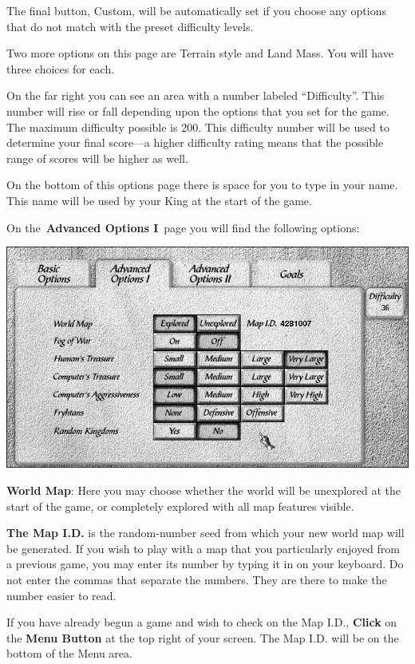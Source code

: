 The final button, Custom, will be automatically set if you choose any options that do not match with the preset difficulty levels.

Two more options on this page are Terrain style and Land Mass. You will have three choices for each.

On the far right you can see an area with a number labeled “Difficulty”. This number will rise or fall depending upon the options that you set for the game. The maximum difficulty possible is 200. This difficulty number will be used to determine your final score---a higher difficulty rating means that the possible range of scores will be higher as well.

On the bottom of this options page there is space for you to type in your name. This name will be used by your King at the start of the game.

On the \textbf{Advanced Options I} page you will find the following options:

\begin{center}
	\includegraphics[width=0.7\linewidth]{Iadvancedoptions1}
\end{center}

\textbf{World Map}: Here you may choose whether the world will be unexplored at the start of the game, or completely explored with all map features visible.

\begin{adjustwidth}{1cm}{}
 \textbf{The Map I.D.} is the random-number seed from which your new world map will be generated. If you wish to play with a map that you particularly enjoyed from a previous game, you may enter its number by typing it in on your keyboard. Do not enter the commas that separate the numbers. They are there to make the number easier to read.
\end{adjustwidth}

\begin{adjustwidth}{1cm}{}
 If you have already begun a game and wish to check on the Map I.D., \textbf{Click} on the \textbf{Menu Button} at the top right of your screen. The Map I.D. will be on the bottom of the Menu area.
\end{adjustwidth}


